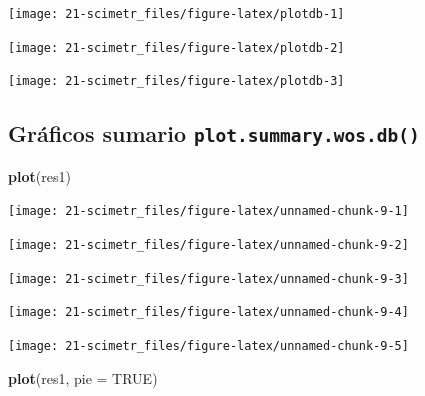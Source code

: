 \documentclass[]{book}
\newenvironment{Shaded}{\begin{snugshade}}{\end{snugshade}}
\newcommand{\KeywordTok}[1]{\textcolor[rgb]{0.13,0.29,0.53}{\textbf{#1}}}
\newcommand{\DataTypeTok}[1]{\textcolor[rgb]{0.13,0.29,0.53}{#1}}
\newcommand{\OtherTok}[1]{\textcolor[rgb]{0.56,0.35,0.01}{#1}}
\newcommand{\NormalTok}[1]{#1}
\begin{document}
\begin{center}\texttt{[image: 21-scimetr\_files/figure-latex/plotdb-1]} \end{center}

\begin{center}\texttt{[image: 21-scimetr\_files/figure-latex/plotdb-2]} \end{center}

\begin{center}\texttt{[image: 21-scimetr\_files/figure-latex/plotdb-3]} \end{center}

\subsection{\texorpdfstring{Gráficos sumario
\texttt{plot.summary.wos.db()}}{Gráficos sumario plot.summary.wos.db()}}\label{gruxe1ficos-sumario-plot.summary.wos.db}

\begin{Shaded}
\begin{Highlighting}[]
\KeywordTok{plot}\NormalTok{(res1)}
\end{Highlighting}
\end{Shaded}

\begin{flushleft}\texttt{[image: 21-scimetr\_files/figure-latex/unnamed-chunk-9-1]} \end{flushleft}

\begin{flushleft}\texttt{[image: 21-scimetr\_files/figure-latex/unnamed-chunk-9-2]} \end{flushleft}

\begin{flushleft}\texttt{[image: 21-scimetr\_files/figure-latex/unnamed-chunk-9-3]} \end{flushleft}

\begin{flushleft}\texttt{[image: 21-scimetr\_files/figure-latex/unnamed-chunk-9-4]} \end{flushleft}

\begin{flushleft}\texttt{[image: 21-scimetr\_files/figure-latex/unnamed-chunk-9-5]} \end{flushleft}

\begin{Shaded}
\begin{Highlighting}[]
\KeywordTok{plot}\NormalTok{(res1, }\DataTypeTok{pie =} \OtherTok{TRUE}\NormalTok{)}
\end{Highlighting}
\end{Shaded}
\end{document}
